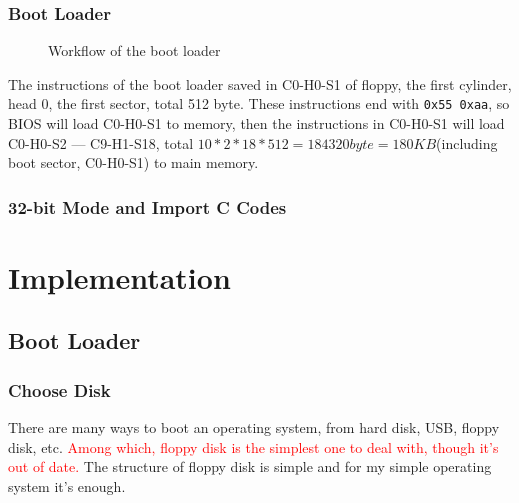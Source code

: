 \documentclass{swfcthesis}
\begin{document}
\subsection{Boot Loader}
\label{sec:boot-loader}


\begin{figure}[!ht]
  \centering
  \caption{Workflow of the boot loader}
  \label{fig:working-flow-boot-loader}
\end{figure}



The instructions of the boot loader saved in C0-H0-S1 of floppy, the first cylinder, head 0,
the first sector, total 512 byte. These instructions end with \texttt{0x55 0xaa}, so BIOS will load
C0-H0-S1 to memory, then the instructions in C0-H0-S1 will load C0-H0-S2 --- C9-H1-S18,
total $10*2*18*512=184320byte=180KB$(including boot sector, C0-H0-S1) to main memory.

\subsection{32-bit Mode and Import C Codes}
\label{sec:32-bit-mode}


\chapter{Implementation}

\section{Boot Loader}

\subsection{Choose Disk}
\label{sec:chose-disk}


There are many ways to boot an operating system, from hard disk, USB, floppy disk,
etc. \textcolor{red}{Among which, floppy disk is the simplest one to deal with, though
  it's out of date.}   The structure of floppy disk is simple and for my simple operating system
it's enough.
\end{document}
